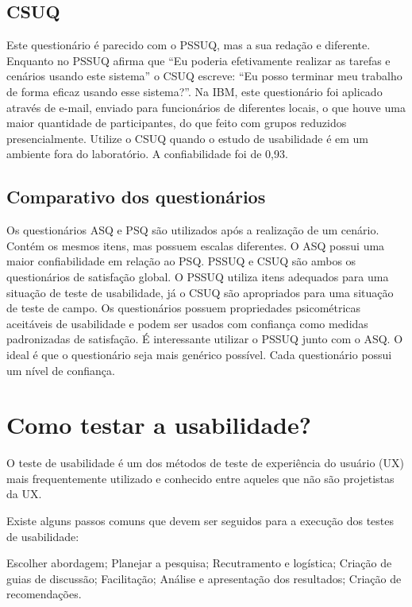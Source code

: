 \subsection{CSUQ}

Este questionário é parecido com o PSSUQ, mas a sua redação e diferente. Enquanto no PSSUQ afirma que “Eu poderia efetivamente realizar as tarefas e cenários usando este sistema” o CSUQ escreve: “Eu posso terminar meu trabalho de forma eficaz usando esse sistema?”. 
Na IBM, este questionário foi aplicado através de e-mail, enviado para funcionários de diferentes locais, o que houve uma maior quantidade de participantes, do que feito com grupos reduzidos presencialmente.
Utilize o CSUQ quando o estudo de usabilidade é em um ambiente fora do laboratório.
A confiabilidade foi de 0,93.

\subsection{Comparativo dos questionários}

Os questionários ASQ e PSQ são utilizados após a realização de um cenário. Contém os mesmos itens, mas possuem escalas diferentes. O ASQ possui uma maior confiabilidade em relação ao PSQ. 
PSSUQ e CSUQ são ambos os questionários de satisfação global. O PSSUQ utiliza itens adequados para uma situação de teste de usabilidade, já o CSUQ são apropriados para uma situação de teste de campo. Os questionários possuem propriedades psicométricas aceitáveis de usabilidade e podem ser usados com confiança como medidas padronizadas de satisfação. É interessante utilizar o PSSUQ junto com o ASQ.
O ideal é que o questionário seja mais genérico possível. Cada questionário possui um nível de confiança.


\section{Como testar a usabilidade?}

O teste de usabilidade é um dos métodos de teste de experiência do usuário (UX) mais frequentemente utilizado e conhecido entre aqueles que não são projetistas da UX.

Existe alguns passos comuns que devem ser seguidos para a execução dos testes de usabilidade:

Escolher abordagem;
Planejar a pesquisa;
Recutramento e logística;
Criação de guias de discussão;
Facilitação;
Análise e apresentação dos resultados;
Criação de recomendações.


